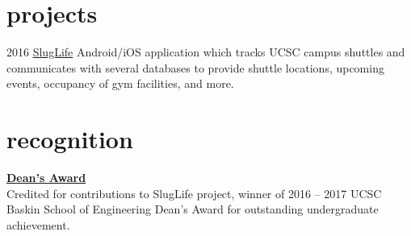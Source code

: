 \documentclass[]{./friggeri-cv}
\begin{document}
\section{projects}
\begin{entrylist}
  \entry
    {2016}
    {\href{https://sites.google.com/a/ucsc.edu/sluglife/}{SlugLife}}
    {}
    {Android/iOS application which tracks UCSC campus shuttles and
    communicates with several databases to provide shuttle locations, upcoming
    events, occupancy of gym facilities, and more.}
\end{entrylist}
\section{recognition}
    {\href{http://honors.ucsc.edu/awards/dca/index.html}{\bf Dean's Award}}\\
    Credited for contributions to SlugLife project, winner of
    2016 -- 2017 UCSC Baskin School of Engineering Dean's Award for outstanding
    undergraduate achievement.%
\end{document}
